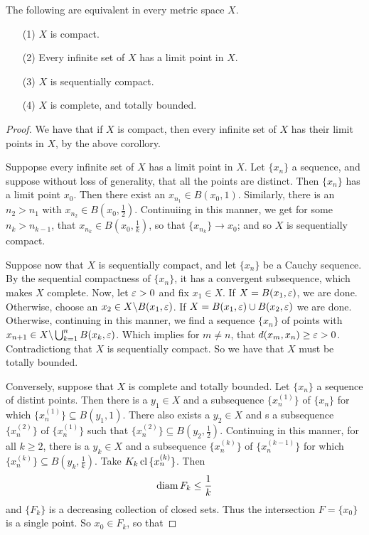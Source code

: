 \begin{theorem}\label{2.4.4}
    The following are equivalent in every metric space $X$.
    \begin{enumerate}
        \item[(1)] $X$ is compact.

        \item[(2)] Every infinite set of  $X$ has a limit point in  $X$.

        \item[(3)] $X$ is sequentially compact.

        \item[(4)] $X$ is complete, and totally bounded.
    \end{enumerate}
\end{theorem}
\begin{proof}
    We have that if $X$ is compact, then every infinite set of  $X$ has their
    limit points in  $X$, by the above corollory.

    Suppopse every infinite set of $X$ has a limit point in $X$. Let $\{x_n\}$
    a sequence, and suppose without loss of generality, that all the points are
    distinct. Then $\{x_n\}$ has a limit point $x_0$. Then there exist an
    $x_{n_1} \in B(x_0,1)$. Similarly, there is an $n_2>n_1$ with $x_{n_2} \in
    B(x_0, \frac{1}{2})$. Continuiing in this manner, we get for some
    $n_k>n_{k-1}$, that $x_{n_k} \in B(x_0, \frac{1}{k})$, so that $\{x_{n_k}\}
    \xrightarrow{} x_0$; and so $X$ is sequentially compact.

    Suppose now that  $X$ is sequentially compact, and let  $\{x_n\}$ be a
    Cauchy sequence. By the sequential compactness of $\{x_n\}$, it has a
    convergent subsequence, which makes $X$ complete. Now, let  $\varepsilon>0$ and fix
    $x_1 \in X$. If $X=B(x_1,\varepsilon)$, we are done. Otherwise, choose an $x_2 \in
    X \backslash B(x_1,\varepsilon){}$. If $X=B(x_1,\varepsilon) \cup B(x_2,\varepsilon)$ we are done. Otherwise,
    continuing in this manner, we find a sequence $\{x_n\}$ of points with
    $x_{n+1} \in X \backslash \bigcup_{k=1}^n{B(x_k,\varepsilon)}$. Which implies for $m \neq
    n$, that  $d(x_m,x_n) \geq \varepsilon>0$. Contradictiong that $X$ is sequentially
    compact. So we have that  $X$ must be totally bounded.

    Conversely, suppose that $X$ is complete and totally bounded. Let  $\{x_n\}$
    a sequence of distint points. Then there is a $y_1 \in X$ and a subsequence
    $\{x_n^{(1)}\}$ of $\{x_n\}$ for which $\{x_n^{(1)}\} \subseteq B(y_1,1)$.
    There also exists a $y_2 \in X$ and s a subsequence $\{x_n^{(2)}\}$ of
    $\{x_n^{(1)}\}$ such that $\{x_n^{(2)}\} \subseteq B(y_2, \frac{1}{2})$.
    Continuing in this manner, for all $k \geq 2$, there is a  $y_k \in X$ and a
    subsequence $\{x_n^{(k)}\}$ of $\{x_n^{(k-1)}\}$ for which $\{x_n^{(k)}\}
    \subseteq B(y_k,\frac{1}{k})$. Take $K_k\operatorname{cl}{\{x_n^{(k)}\}}$. Then
    \begin{equation*}
        \operatorname{diam}{F_k} \leq \frac{1}{k}
    \end{equation*}
    and $\{F_k\}$ is a decreasing collection of closed sets. Thus the
    intersection $F=\{x_0\}$ is a single point. So $x_0 \in F_k$, so that


\end{proof}
